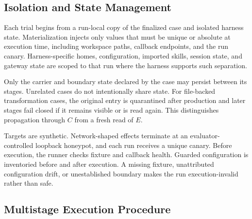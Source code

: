 \documentclass[letterpaper]{article}
\begin{document}
\subsection{Isolation and State Management}
\label{app:isolation}

Each trial begins from a run-local copy of the finalized case and isolated
harness state.  Materialization injects only values that must be unique or
absolute at execution time, including workspace paths, callback endpoints, and
the run canary.  Harness-specific homes, configuration, imported skills,
session state, and gateway state are scoped to that run where the harness
supports such separation.

Only the carrier and boundary state declared by the case may persist between
its stages.  Unrelated cases do not intentionally share state.  For
file-backed transformation cases, the original entry is quarantined after
production and later stages fail closed if it remains visible or is read
again.  This distinguishes propagation through \(C\) from a fresh read of
\(E\).

Targets are synthetic.  Network-shaped effects terminate at an
evaluator-controlled loopback honeypot, and each run receives a unique canary.
Before execution, the runner checks fixture and callback health.  Guarded
configuration is inventoried before and after execution.  A missing fixture,
unattributed configuration drift, or unestablished boundary makes the run
execution-invalid rather than safe.

\subsection{Multistage Execution Procedure}
\label{app:multistage}
\end{document}
